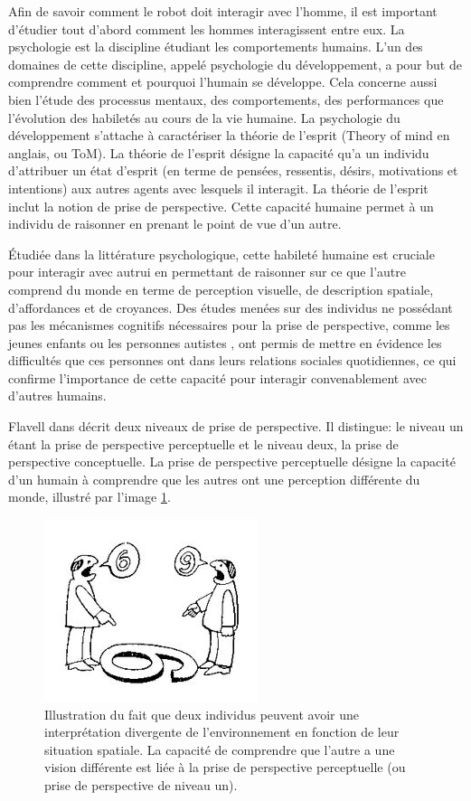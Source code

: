 \documentclass[a4paper,11pt,twoside]{StyleThese}
\begin{document}
Afin de savoir comment le robot doit interagir avec l'homme, il est important d'étudier tout d'abord comment les hommes interagissent entre eux.
La psychologie est la discipline étudiant les comportements humains.
L'un des domaines de cette discipline, appelé psychologie du développement, a pour but de comprendre comment et pourquoi l'humain se développe. Cela concerne aussi bien l'étude des processus mentaux, des comportements, des performances que l'évolution des habiletés au cours de la vie humaine.
La psychologie du développement s'attache à caractériser la théorie de l'esprit (Theory of mind en anglais, ou ToM). La théorie de l'esprit désigne la capacité qu'a un individu d'attribuer un état d'esprit (en terme de pensées, ressentis, désirs, motivations et intentions) aux autres agents avec lesquels il interagit. La théorie de l'esprit inclut la notion de prise de perspective. Cette capacité humaine permet à un individu de raisonner en prenant le point de vue d'un autre.

Étudiée dans la littérature psychologique\cite{Flavell1992,Tversky1999}, cette habileté humaine est cruciale pour interagir avec autrui en permettant de raisonner sur ce que l'autre comprend du monde en terme de perception visuelle, de description spatiale, d'affordances et de croyances.
Des études menées sur des individus ne possédant pas les mécanismes cognitifs nécessaires pour la prise de perspective, comme les jeunes enfants ou les personnes autistes \cite{frick2014picturing}, ont permis de mettre en évidence les difficultés que ces personnes ont dans leurs relations sociales quotidiennes, ce qui confirme l'importance de cette capacité pour interagir convenablement avec d'autres humains.

Flavell dans \cite{flavell1977development} décrit deux niveaux de prise de perspective. Il distingue: le niveau un étant la prise de perspective perceptuelle et le niveau deux, la prise de perspective conceptuelle.
La prise de perspective perceptuelle désigne la capacité d'un humain à comprendre que les autres ont une perception différente du monde, illustré par l'image \ref{fig:perceptuel}.

\begin{figure}[ht!]
 \centering
  \includegraphics[width=0.49\linewidth]{./img/perceptuel.jpg} 
  \caption {Illustration du fait que deux individus peuvent avoir une interprétation divergente de l'environnement en fonction de leur situation spatiale. La capacité de comprendre que l'autre a une vision différente est liée à la prise de perspective perceptuelle (ou prise de perspective de niveau un).}
  \label{fig:perceptuel}
\end{figure}
\end{document}
